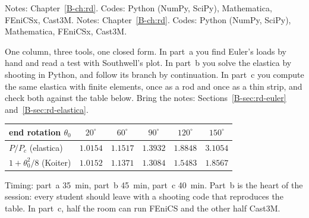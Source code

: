 \clearpage
\renewcommand{\sessionchapter}{Chapter 4 -- Rods: the elastica and beyond}
\setcounter{spart}{0}
\setcounter{algorithm}{0}
\ifanswers
{}
  {Notes: Chapter~\ref{B-ch:rd}. Codes: Python (NumPy, SciPy), Mathematica, FEniCSx, Cast3M.}
\else
{}
  {Notes: Chapter~\ref{B-ch:rd}. Codes: Python (NumPy, SciPy), Mathematica, FEniCSx, Cast3M.}
\fi

\noindent
One column, three tools, one closed form. In part~a you find Euler's loads by hand and read a
test with Southwell's plot. In part~b you solve the elastica by shooting in Python, and follow
its branch by continuation. In part~c you compute the same elastica with finite elements, once
as a rod and once as a thin strip, and check both against the table below. Bring the notes:
Sections~\ref{B-sec:rd-euler} and~\ref{B-sec:rd-elastica}.

\begin{center}
\begin{tabular}{@{}lccccc@{}}
  \toprule
  end rotation $\theta_0$ & $20^\circ$ & $60^\circ$ & $90^\circ$ & $120^\circ$ & $150^\circ$ \\
  \midrule
  $P/P_c$ (elastica) & $1.0154$ & $1.1517$ & $1.3932$ & $1.8848$ & $3.1054$ \\
  $1 + \theta_0^2/8$ (Koiter) & $1.0152$ & $1.1371$ & $1.3084$ & $1.5483$ & $1.8567$ \\
  \bottomrule
\end{tabular}
\end{center}

\begin{instructor}
Timing: part~a 35~min, part~b 45~min, part~c 40~min. Part~b is the heart of the session: every
student should leave with a shooting code that reproduces the table. In part~c, half the room
can run FEniCS and the other half Cast3M.
\end{instructor}

